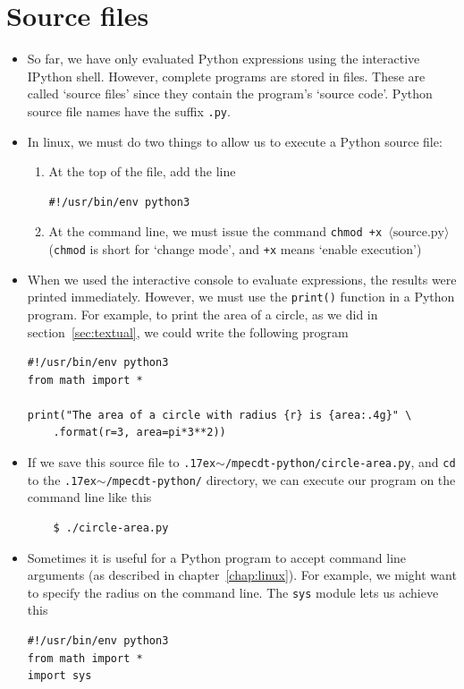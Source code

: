 \documentclass[a4paper,twoside,titlepage]{memoir}
\newcommand{\shellcmd}{\texttt}
\newcommand{\shellvar}[1]{$\langle \text{#1}\rangle$}
\newcommand{\home}{\raise.17ex\hbox{$\scriptstyle\mathtt{\sim}$}}
\begin{document}
\section{Source files}
\begin{itemize}
\item So far, we have only evaluated Python expressions using the interactive IPython shell.  However, complete programs are stored in files.  These are called `source files' since they contain the program's `source code'.  Python source file names have the suffix \shellcmd{.py}.
\item In linux, we must do two things to allow us to execute a Python source file:
\begin{enumerate}
	\item At the top of the file, add the line
\begin{verbatim}
#!/usr/bin/env python3
\end{verbatim}
	\item At the command line, we must issue the command \shellcmd{chmod +x \shellvar{source.py}} (\shellcmd{chmod} is short for `change mode', and \shellcmd{+x} means `enable execution')
\index{chmod@\shellcmd{chmod}}
\end{enumerate}
\item When we used the interactive console to evaluate expressions, the results were printed immediately.  However, we must use the \shellcmd{print()} function in a Python program.  For example, to print the area of a circle, as we did in section~\ref{sec:textual}, we could write the following program
\index{print@\shellcmd{print()}}
\begin{verbatim}
#!/usr/bin/env python3
from math import *

print("The area of a circle with radius {r} is {area:.4g}" \
	.format(r=3, area=pi*3**2))
\end{verbatim}
\item If we save this source file to \shellcmd{\home/mpecdt-python/circle-area.py}, and \shellcmd{cd} to the \shellcmd{\home/mpecdt-python/} directory, we can execute our program on the command line like this
\begin{verbatim}
	$ ./circle-area.py
\end{verbatim}
\item Sometimes it is useful for a Python program to accept command line arguments (as described in chapter~\ref{chap:linux}).  For example, we might want to specify the radius on the command line.  The \shellcmd{sys} module lets us achieve this
\begin{verbatim}
#!/usr/bin/env python3
from math import *
import sys


\end{verbatim}
\end{itemize}
\end{document}
